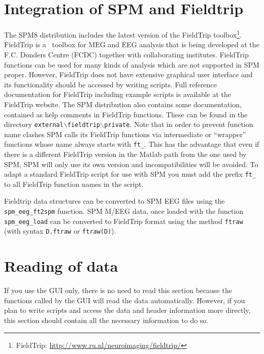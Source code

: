 \section{Integration of SPM and Fieldtrip}
The SPM8 distribution includes the latest version of the FieldTrip toolbox\footnote{FieldTrip: \url{http://www.ru.nl/neuroimaging/fieldtrip/}}. FieldTrip is a \matlab\ toolbox for MEG and EEG analysis that is being developed at the F.C. Donders Centre (FCDC) together with collaborating institutes. FieldTrip functions can be used for many kinds of analysis which are not supported in SPM proper. However, FieldTrip does not have extensive graphical user interface and its functionality should be accessed by writing scripts. Full reference documentation for FieldTrip including example scripts is available at the FieldTrip website. The SPM distribution also contains some documentation, contained as help comments in FieldTrip functions. These can be found in the directory \texttt{external$\backslash$fieldtrip$\backslash$private}. Note that in order to prevent function name clashes SPM calls its FieldTrip functions via intermediate or ``wrapper'' functions whose name always starts with \texttt{ft\_}. This has the advantage that even if there is a different FieldTrip version in the Matlab path from the one used by SPM, SPM will only use its own version and incompatibilities will be avoided. To adapt a standard FieldTrip script for use with SPM you must add the prefix \texttt{ft\_} to all FieldTrip function names in the script.

Fieldtrip data structures can be converted to SPM EEG files using the \texttt{spm\_eeg\_ft2spm} function. SPM M/EEG data, once loaded with the function \texttt{spm\_eeg\_load} can be converted to FieldTrip format using the method \texttt{ftraw} (with syntax \texttt{D.ftraw} or \texttt{ftraw(D)}).

\section{Reading of data\label{sec:load}}
If you use the GUI only, there is no need to read this section because the functions called by the GUI will read the data automatically. However, if you plan to write scripts and access the data and header information more directly, this section should contain all the necessary information to do so.

